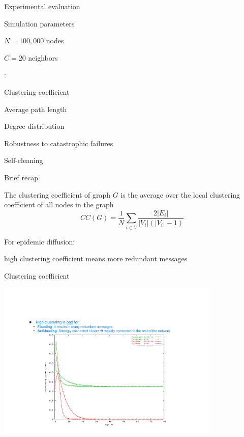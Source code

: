 \begin{frame}{Experimental evaluation}

\begin{block}{Simulation parameters}
\BI
\item $N=100,000$ nodes
\item $C=20$ neighbors
\EI
\end{block}

\bigskip
{}:
\BI
\item Clustering coefficient
\item Average path length
\item Degree distribution
\item Robustness to catastrophic failures
\item Self-cleaning
\EI

\end{frame}

\begin{frame}{Brief recap}

\begin{definition}

The \alert{clustering coefficient} of graph $G$ is the average over the local 
  clustering coefficient of all nodes in the graph
  \[
     CC(G) = \frac{1}{N} \sum_{i \in V} \frac{2|E_i|}{|V_i|(|V_i|-1)}
  \]
\end{definition}

\bigskip
For epidemic diffusion:
\BI
\item high clustering coefficient means more redundant messages
\EI

\end{frame}

\begin{frame}{Clustering coefficient}
	
\begin{center}
\includegraphics[width=0.8\textwidth]{figs/11/clustering}	
\end{center}
	

	
\end{frame}


